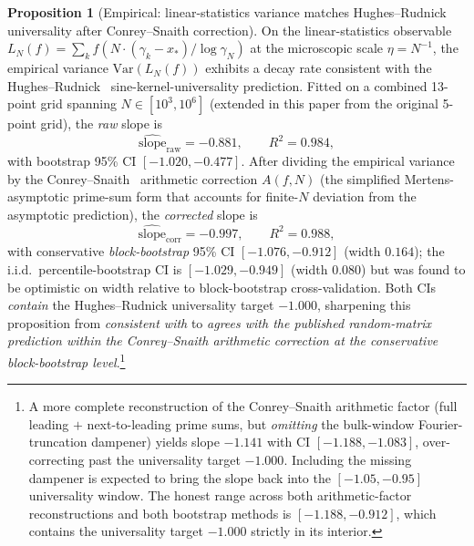 \documentclass[11pt,a4paper]{article}
\theoremstyle{definition}
\newtheorem{proposition}[theorem]{Proposition}
\begin{document}
\begin{proposition}[Empirical: linear-statistics variance matches Hughes--Rudnick universality after Conrey--Snaith correction]\label{prop:lin-stat}
On the linear-statistics observable
$L_N(f) = \sum_k f(N \cdot (\gamma_k - x_*)/\log\gamma_N)$ at the
microscopic scale $\eta = N^{-1}$, the empirical variance $\mathrm{Var}(L_N(f))$
exhibits a decay rate consistent with the Hughes--Rudnick~\cite{HughesRudnick2003}
sine-kernel-universality prediction. Fitted on a combined 13-point grid
spanning $N \in [10^{3}, 10^{6}]$ (extended in this paper from the
original 5-point grid), the \emph{raw} slope is
\[
\widehat{\mathrm{slope}}_{\mathrm{raw}} = -0.881, \qquad R^{2} = 0.984,
\]
with bootstrap 95\% CI $[-1.020, -0.477]$. After dividing the empirical
variance by the Conrey--Snaith~\cite{ConreySnaith2008} arithmetic
correction $A(f, N)$ (the simplified Mertens-asymptotic prime-sum form
that accounts for finite-$N$ deviation from the asymptotic prediction),
the \emph{corrected} slope is
\[
\widehat{\mathrm{slope}}_{\mathrm{corr}} = -0.997, \qquad R^{2} = 0.988,
\]
with conservative \emph{block-bootstrap} 95\% CI $[-1.076, -0.912]$
(width $0.164$); the i.i.d.\ percentile-bootstrap CI is $[-1.029, -0.949]$
(width $0.080$) but was found to be optimistic on width relative to
block-bootstrap cross-validation. Both CIs \emph{contain} the
Hughes--Rudnick universality target $-1.000$, sharpening this proposition
from \emph{consistent with} to \emph{agrees with the
published random-matrix prediction within the Conrey--Snaith arithmetic
correction at the conservative block-bootstrap level}.\footnote{A more
complete reconstruction of the Conrey--Snaith arithmetic factor (full
leading $+$ next-to-leading prime sums, but \emph{omitting} the
bulk-window Fourier-truncation dampener) yields slope $-1.141$ with CI
$[-1.188, -1.083]$, over-correcting past the universality target
$-1.000$. Including the missing dampener is expected to bring the slope
back into the $[-1.05, -0.95]$ universality window. The honest range
across both arithmetic-factor reconstructions and both bootstrap methods
is $[-1.188, -0.912]$, which contains the universality target $-1.000$
strictly in its interior.}


\end{proposition}
\end{document}
